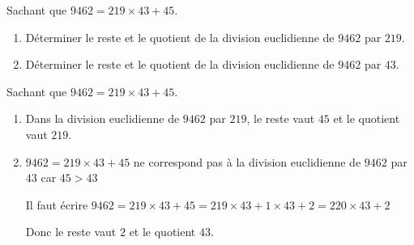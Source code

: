\begin{exercice*}
    Sachant que $\num{9462}=219\times 43 + 45$.
    \begin{enumerate}
        \item Déterminer le reste et le quotient de la division euclidienne de $\num{9462}$ par $219$.
        \item Déterminer le reste et le quotient de la division euclidienne de $\num{9462}$ par $43$.
    \end{enumerate}


\end{exercice*}
\begin{corrige}
    Sachant que $\num{9462}=219\times 43 + 45$.
    
    \begin{enumerate}
        \item Dans la division euclidienne de $\num{9462}$ par $219$, le reste vaut $45$ et le quotient vaut $219$.
        \item $\num{9462}=219\times 43 + 45$ ne correspond pas à la division euclidienne de $\num{9462}$ par $43$ car $45>43$ 
        
        Il faut écrire $\num{9462}=219\times 43 + 45 = 219\times 43 + 1\times 43 + 2 = 220\times 43 +2$
        
        Donc le reste vaut $2$ et le quotient $43$.
    \end{enumerate}    
\end{corrige}

